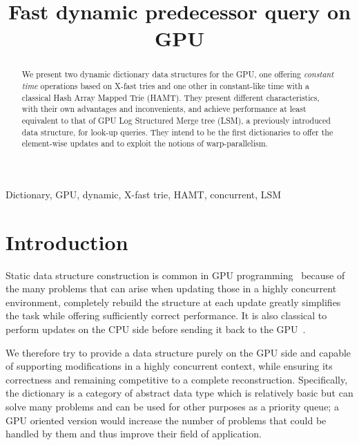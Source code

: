 \documentclass[conference]{IEEEtran}
\begin{document}
\title{Fast dynamic predecessor query on GPU}

\author{
\and
{}
}

\maketitle

\begin{abstract}
We present two dynamic dictionary data structures for the GPU, one offering \textit{constant time} operations based on X-fast tries and one other in constant-like time with a classical Hash Array Mapped Trie (HAMT). They present different characteristics, with their own advantages and inconvenients, and achieve performance at least equivalent to that of GPU Log Structured Merge tree (LSM), a previously introduced data structure, for look-up queries. They intend to be the first dictionaries to offer the element-wise updates and to exploit the notions of warp-parallelism.
\end{abstract}

\begin{IEEEkeywords}
Dictionary, GPU, dynamic, X-fast trie, HAMT, concurrent, LSM
\end{IEEEkeywords}

\section{Introduction}
Static data structure construction is common in GPU programming~\cite{alcantara2009real} because of the many problems that can arise when updating those in a highly concurrent environment, completely rebuild the structure at each update greatly simplifies the task while offering sufficiently correct performance. It is also classical to perform updates on the CPU side before sending it back to the GPU~\cite{li2013gamt}.

We therefore try to provide a data structure purely on the GPU side and capable of supporting modifications in a highly concurrent context, while ensuring its correctness and remaining competitive to a complete reconstruction. Specifically, the dictionary is a category of abstract data type which is relatively basic but can solve many problems and can be used for other purposes as a priority queue; a GPU oriented version would increase the number of problems that could be handled by them and thus improve their field of application.
\end{document}
